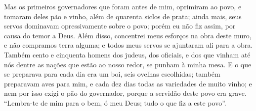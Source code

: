 {{  Mas os primeiros governadores que foram antes de mim, oprimiram ao povo, e tomaram deles pão e vinho, além de quarenta siclos de prata; ainda mais, seus servos dominavam opressivamente sobre o povo; porém eu não fiz assim, por causa do temor a Deus. %
  Além disso, concentrei meus esforços na obra deste muro, e não compramos terra alguma; e todos {} meus servos se ajuntaram ali para a obra.
  Também cento e cinquenta homens dos judeus, dos oficiais, e dos que vinham até nós dentre as nações que estão ao nosso redor, se punham à minha mesa. %
  E o que se preparava para cada dia era um boi, {} seis ovelhas escolhidas; também preparavam aves para mim, e cada dez dias todas as variedades de muito vinho; e nem por isso exigi o pão do governador, porque a servidão deste povo era grave.
  \enquote{Lembra-te de mim para o bem, ó meu Deus; {} tudo o que fiz a este povo}}.
\par }

